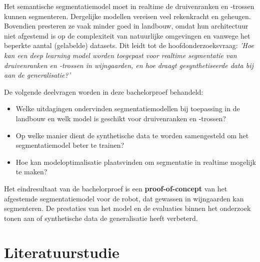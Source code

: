 Het semantische segmentatiemodel moet in realtime de druivenranken en -trossen kunnen segmenteren. Dergelijke modellen vereisen veel rekenkracht en geheugen. Bovendien presteren ze vaak minder goed in landbouw, omdat hun architectuur niet afgestemd is op de complexiteit van natuurlijke omgevingen en vanwege het beperkte aantal (gelabelde) datasets. Dit leidt tot de hoofdonderzoeksvraag: \emph{'Hoe kan een deep learning model worden toegepast voor realtime segmentatie van druivenranken en -trossen in wijngaarden, en hoe draagt gesynthetiseerde data bij aan de generalisatie?'}

De volgende deelvragen worden in deze bachelorproef behandeld:
\begin{itemize}
    \setlength{\itemsep}{0pt}
    \setlength{\parskip}{0pt} 
    \item Welke uitdagingen ondervinden segmentatiemodellen bij toepassing in de landbouw en welk model is geschikt voor druivenranken en -trossen?
    \item Op welke manier dient de synthetische data te worden samengesteld om het segmentatiemodel beter te trainen?
    \item Hoe kan modeloptimalisatie plaatsvinden om segmentatie in realtime mogelijk te maken?
\end{itemize}

Het eindresultaat van de bachelorproef is een \textbf{proof-of-concept} van het afgestemde segmentatiemodel voor de robot, dat gewassen in wijngaarden kan segmenteren. De prestaties van het model en de evaluaties binnen het onderzoek tonen aan of synthetische data de generalisatie heeft verbeterd.


\section{Literatuurstudie}%
\label{sec:literatuurstudie}


